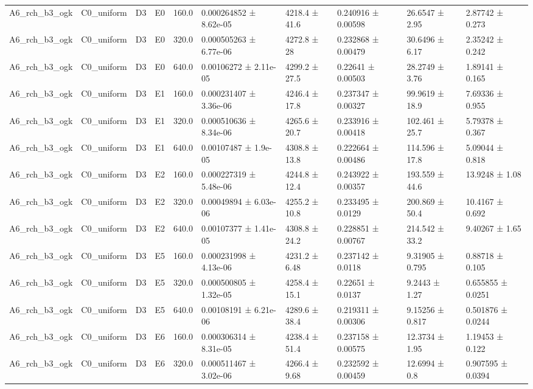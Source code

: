 \begin{table}
\begin{tabular}{llllllllll}
A6\_rch\_b3\_ogk & C0\_uniform & D3 & E0 & 160.0 & 0.000264852 ± 8.62e-05 & 4218.4 ± 41.6 & 0.240916 ± 0.00598 & 26.6547 ± 2.95 & 2.87742 ± 0.273 \\
A6\_rch\_b3\_ogk & C0\_uniform & D3 & E0 & 320.0 & 0.000505263 ± 6.77e-06 & 4272.8 ± 28 & 0.232868 ± 0.00479 & 30.6496 ± 6.17 & 2.35242 ± 0.242 \\
A6\_rch\_b3\_ogk & C0\_uniform & D3 & E0 & 640.0 & 0.00106272 ± 2.11e-05 & 4299.2 ± 27.5 & 0.22641 ± 0.00503 & 28.2749 ± 3.76 & 1.89141 ± 0.165 \\
A6\_rch\_b3\_ogk & C0\_uniform & D3 & E1 & 160.0 & 0.000231407 ± 3.36e-06 & 4246.4 ± 17.8 & 0.237347 ± 0.00327 & 99.9619 ± 18.9 & 7.69336 ± 0.955 \\
A6\_rch\_b3\_ogk & C0\_uniform & D3 & E1 & 320.0 & 0.000510636 ± 8.34e-06 & 4265.6 ± 20.7 & 0.233916 ± 0.00418 & 102.461 ± 25.7 & 5.79378 ± 0.367 \\
A6\_rch\_b3\_ogk & C0\_uniform & D3 & E1 & 640.0 & 0.00107487 ± 1.9e-05 & 4308.8 ± 13.8 & 0.222664 ± 0.00486 & 114.596 ± 17.8 & 5.09044 ± 0.818 \\
A6\_rch\_b3\_ogk & C0\_uniform & D3 & E2 & 160.0 & 0.000227319 ± 5.48e-06 & 4244.8 ± 12.4 & 0.243922 ± 0.00357 & 193.559 ± 44.6 & 13.9248 ± 1.08 \\
A6\_rch\_b3\_ogk & C0\_uniform & D3 & E2 & 320.0 & 0.00049894 ± 6.03e-06 & 4255.2 ± 10.8 & 0.233495 ± 0.0129 & 200.869 ± 50.4 & 10.4167 ± 0.692 \\
A6\_rch\_b3\_ogk & C0\_uniform & D3 & E2 & 640.0 & 0.00107377 ± 1.41e-05 & 4308.8 ± 24.2 & 0.228851 ± 0.00767 & 214.542 ± 33.2 & 9.40267 ± 1.65 \\
A6\_rch\_b3\_ogk & C0\_uniform & D3 & E5 & 160.0 & 0.000231998 ± 4.13e-06 & 4231.2 ± 6.48 & 0.237142 ± 0.0118 & 9.31905 ± 0.795 & 0.88718 ± 0.105 \\
A6\_rch\_b3\_ogk & C0\_uniform & D3 & E5 & 320.0 & 0.000500805 ± 1.32e-05 & 4258.4 ± 15.1 & 0.22651 ± 0.0137 & 9.2443 ± 1.27 & 0.655855 ± 0.0251 \\
A6\_rch\_b3\_ogk & C0\_uniform & D3 & E5 & 640.0 & 0.00108191 ± 6.21e-06 & 4289.6 ± 38.4 & 0.219311 ± 0.00306 & 9.15256 ± 0.817 & 0.501876 ± 0.0244 \\
A6\_rch\_b3\_ogk & C0\_uniform & D3 & E6 & 160.0 & 0.000306314 ± 8.31e-05 & 4238.4 ± 51.4 & 0.237158 ± 0.00575 & 12.3734 ± 1.95 & 1.19453 ± 0.122 \\
A6\_rch\_b3\_ogk & C0\_uniform & D3 & E6 & 320.0 & 0.000511467 ± 3.02e-06 & 4266.4 ± 9.68 & 0.232592 ± 0.00459 & 12.6994 ± 0.8 & 0.907595 ± 0.0394 \\

\end{tabular}
\end{table}
